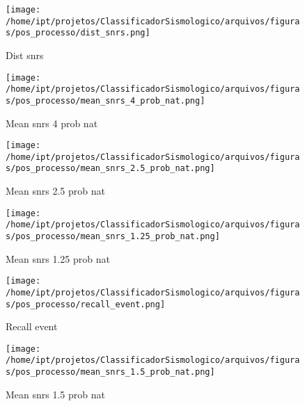 
                    \begin{figure}[H]
                        \centering
                        \texttt{[image: /home/ipt/projetos/ClassificadorSismologico/arquivos/figuras/pos\_processo/dist\_snrs.png]}
                        \caption{Dist snrs}
                        \label{fig:dist_snrs}
                    \end{figure}
                

                    \begin{figure}[H]
                        \centering
                        \texttt{[image: /home/ipt/projetos/ClassificadorSismologico/arquivos/figuras/pos\_processo/mean\_snrs\_4\_prob\_nat.png]}
                        \caption{Mean snrs 4 prob nat}
                        \label{fig:mean_snrs_4_prob_nat}
                    \end{figure}
                

                    \begin{figure}[H]
                        \centering
                        \texttt{[image: /home/ipt/projetos/ClassificadorSismologico/arquivos/figuras/pos\_processo/mean\_snrs\_2.5\_prob\_nat.png]}
                        \caption{Mean snrs 2.5 prob nat}
                        \label{fig:mean_snrs_2.5_prob_nat}
                    \end{figure}
                

                    \begin{figure}[H]
                        \centering
                        \texttt{[image: /home/ipt/projetos/ClassificadorSismologico/arquivos/figuras/pos\_processo/mean\_snrs\_1.25\_prob\_nat.png]}
                        \caption{Mean snrs 1.25 prob nat}
                        \label{fig:mean_snrs_1.25_prob_nat}
                    \end{figure}
                

                    \begin{figure}[H]
                        \centering
                        \texttt{[image: /home/ipt/projetos/ClassificadorSismologico/arquivos/figuras/pos\_processo/recall\_event.png]}
                        \caption{Recall event}
                        \label{fig:recall_event}
                    \end{figure}
                

                    \begin{figure}[H]
                        \centering
                        \texttt{[image: /home/ipt/projetos/ClassificadorSismologico/arquivos/figuras/pos\_processo/mean\_snrs\_1.5\_prob\_nat.png]}
                        \caption{Mean snrs 1.5 prob nat}
                        \label{fig:mean_snrs_1.5_prob_nat}
                    \end{figure}
                


